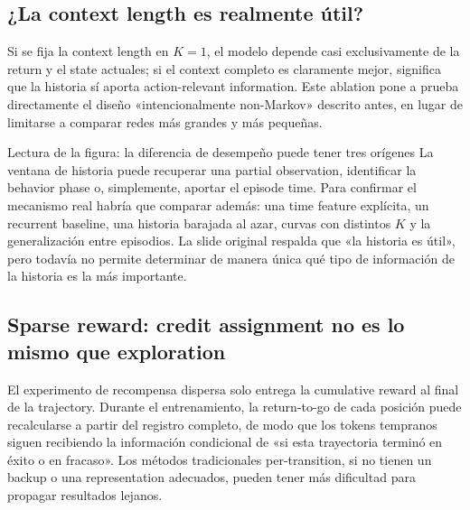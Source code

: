 \subsection{¿La context length es realmente útil?}

Si se fija la context length en $K=1$, el modelo depende casi exclusivamente de la return y el state actuales; si el context completo es claramente mejor, significa que la historia sí aporta action-relevant information. Este ablation pone a prueba directamente el diseño «intencionalmente non-Markov» descrito antes, en lugar de limitarse a comparar redes más grandes y más pequeñas.


\begin{knowledgebox}{Lectura de la figura: la diferencia de desempeño puede tener tres orígenes}
La ventana de historia puede recuperar una partial observation, identificar la behavior phase o, simplemente, aportar el episode time. Para confirmar el mecanismo real habría que comparar además: una time feature explícita, un recurrent baseline, una historia barajada al azar, curvas con distintos $K$ y la generalización entre episodios. La slide original respalda que «la historia es útil», pero todavía no permite determinar de manera única qué tipo de información de la historia es la más importante.
\end{knowledgebox}

\subsection{Sparse reward: credit assignment no es lo mismo que exploration}

El experimento de recompensa dispersa solo entrega la cumulative reward al final de la trajectory. Durante el entrenamiento, la return-to-go de cada posición puede recalcularse a partir del registro completo, de modo que los tokens tempranos siguen recibiendo la información condicional de «si esta trayectoria terminó en éxito o en fracaso». Los métodos tradicionales per-transition, si no tienen un backup o una representation adecuados, pueden tener más dificultad para propagar resultados lejanos.


